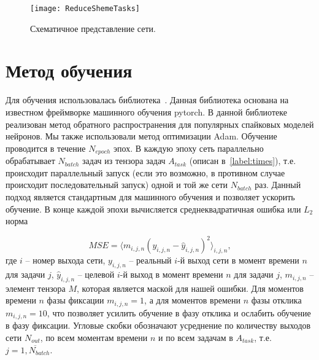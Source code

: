 \documentclass{article}
\begin{document}
\begin{figure}[h!] \label{fig:sheme}
  \begin{center}
    \texttt{[image: ReduceShemeTasks]}
    \caption{Схематичное представление сети.}
  \end{center}
\end{figure}

\newpage

\section{Метод обучения}
Для обучения использовалась библиотека~\cite{norse2021}. Данная библиотека основана на известном фреймворке машинного обучения pytorch. В данной библиотеке реализован метод обратного распространения для популярных спайковых моделей нейронов. Мы также использовали метод оптимизации Adam. Обучение проводится в течение $N_{epoch}$ эпох. В каждую эпоху сеть параллельно обрабатывает $N_{batch}$ задач из тензора задач $A_{task}$ (описан в~\ref{label:times}), т.е. происходит параллельный запуск (если это возможно, в противном случае происходит последовательный запуск) одной и той же сети $N_{batch}$ раз. Данный подход является стандартным для машинного обучения и позволяет ускорить обучение. В конце каждой эпохи вычисляется среднеквадратичная ошибка или $L_2$ норма

\begin{equation}\label{eq:MSE}
  MSE = \langle m_{i, j, n}(y_{i, j, n} - \hat y_{i, j, n})^2\rangle_{i, j, n},
\end{equation}
где $i$ -- номер выхода сети, $y_{i, j, n}$ -- реальный $i$-й выход сети в момент времени $n$ для задачи $j$, $\hat y_{i, j, n}$ -- целевой $i$-й выход в момент времени $n$ для задачи $j$, $m_{i, j,  n}$ -- элемент тензора $M$, которая является маской для нашей ошибки. Для моментов времени $n$ фазы фиксации $m_{i, j, n} = 1$, а для моментов времени $n$ фазы отклика $m_{i, j, n} = 10$, что позволяет усилить обучение в фазу отклика и ослабить обучение в фазу фиксации. Угловые скобки обозначают усреднение по количеству выходов сети $N_{out}$, по всем моментам времени $n$ и по всем задачам в $A_{task}$, т.е. $j = \overline{1, N_{batch}}$.
\end{document}
